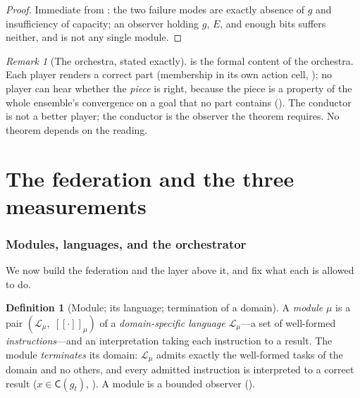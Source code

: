 \documentclass[twocolumn,11pt,a4paper]{article}
\theoremstyle{sup}
\theoremstyle{definition}
\newtheorem{definition}[theorem]{Definition}
\theoremstyle{remark}
\newtheorem{remark}[theorem]{Remark}
\newcommand{\cell}{\mathsf{C}}        %
\newcommand{\task}{t}
\newcommand{\Ens}{E}                  %
\newcommand{\modu}{\mu}               %
\newcommand{\dsl}{\mathcal{L}}        %
\begin{document}
\begin{proof}
Immediate from : the two failure modes are exactly absence of
$g$ and insufficiency of capacity; an observer holding $g$, $\Ens$, and enough
bits suffers neither, and is not any single module.
\end{proof}

\begin{remark}[The orchestra, stated exactly]
\label{rem:orchestra}
 is the formal content of the orchestra. Each player renders a
correct part (membership in its own action cell, ); no player can
hear whether the \emph{piece} is right, because the piece is a property of the
whole ensemble's convergence on a goal that no part contains
(). The conductor is not a better player; the conductor is the
observer the theorem requires. No theorem depends on the reading.
\end{remark}

\part{The federation and the three measurements}

\section{Modules, languages, and the orchestrator}
\label{sec:modules}

We now build the federation and the layer above it, and fix what each is allowed
to do.

\begin{definition}[Module; its language; termination of a domain]
\label{def:module}
A \emph{module} $\modu$ is a pair $(\dsl_\modu,\;[\![\cdot]\!]_\modu)$ of a
\emph{domain-specific language} $\dsl_\modu$---a set of well-formed
\emph{instructions}---and an interpretation taking each instruction to a result.
The module \emph{terminates} its domain: $\dsl_\modu$ admits exactly the
well-formed tasks of the domain and no others, and every admitted instruction is
interpreted to a correct result ($x\in\cell(g_\task)$, ). A module
is a bounded observer ().
\end{definition}
\end{document}
